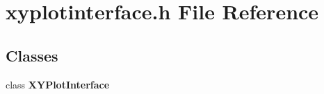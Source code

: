\section{xyplotinterface.\+h File Reference}
\label{bk3_2xyplotinterface_8h}
\subsection*{Classes}
\begin{DoxyCompactItemize}
\item 
class {\bf X\+Y\+Plot\+Interface}
\end{DoxyCompactItemize}

